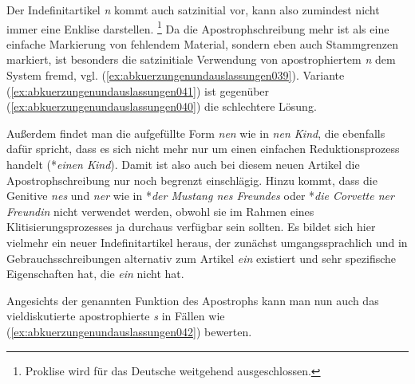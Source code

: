 Der Indefinitartikel \textit{n} kommt \zB auch satzinitial vor, kann also zumindest nicht immer eine Enklise darstellen.\label{abs:abkuerzungenundauslassungen038}%
\footnote{Proklise wird für das Deutsche weitgehend ausgeschlossen.}
Da die Apo\-stroph\-schrei\-bung mehr ist als eine einfache Markierung von fehlendem Material, sondern eben auch Stammgrenzen markiert, ist besonders die satzinitiale Verwendung von apostrophiertem \textit{n} dem System fremd, vgl. (\ref{ex:abkuerzungenundauslassungen039}).
Variante (\ref{ex:abkuerzungenundauslassungen041}) ist gegenüber (\ref{ex:abkuerzungenundauslassungen040}) die schlechtere Lösung.

\begin{exe}
  \ex\label{ex:abkuerzungenundauslassungen039}
  \begin{xlist}
  \end{xlist}
\end{exe}

Außerdem findet man die aufgefüllte Form \textit{nen} wie in \textit{nen Kind}, die ebenfalls dafür spricht, dass es sich nicht mehr nur um einen einfachen Reduktionsprozess handelt (*\textit{einen Kind}).
Damit ist also auch bei diesem neuen Artikel die Apo\-stroph\-schrei\-bung nur noch begrenzt einschlägig.
Hinzu kommt, dass die Genitive \textit{nes} und \textit{ner} wie in *\textit{der Mustang nes Freundes} oder *\textit{die Corvette ner Freundin} nicht verwendet werden, obwohl sie im Rahmen eines Klitisierungsprozesses ja durchaus verfügbar sein sollten.
Es bildet sich hier vielmehr ein neuer Indefinitartikel heraus, der zunächst umgangssprachlich und in Gebrauchsschreibungen alternativ zum Artikel \textit{ein} existiert und sehr spezifische Eigenschaften hat, die \textit{ein} nicht hat.

Angesichts der genannten Funktion des Apostrophs kann man nun auch das vieldiskutierte apostrophierte \textit{s} in Fällen wie (\ref{ex:abkuerzungenundauslassungen042}) bewerten.

\begin{exe}
  \ex\label{ex:abkuerzungenundauslassungen042}
  \begin{xlist}
  \end{xlist}
\end{exe}

